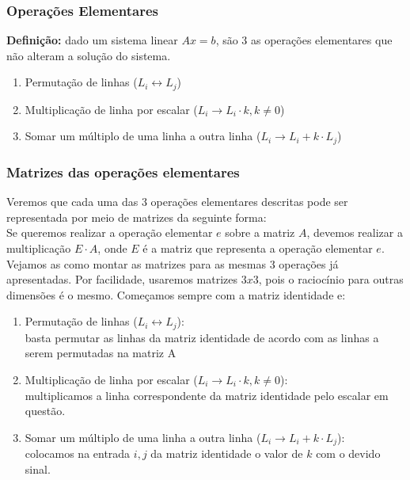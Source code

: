 \documentclass[12pt]{article}
\begin{document}
	\subsubsection{Operações Elementares}
	
	\textbf{Definição:}
	dado um sistema linear $Ax=b$, são 3 as operações elementares que não alteram a solução do sistema.
	\begin{enumerate}
		\item Permutação de linhas ($L_i\leftrightarrow L_j$)
		\item Multiplicação de linha por escalar ($L_i\rightarrow L_i \cdot k,k \neq 0$)
		\item Somar um múltiplo de uma linha a outra linha ($L_i \rightarrow L_i+k\cdot L_j$)
	\end{enumerate}
	
	\subsubsection{Matrizes das operações elementares}
	
	Veremos que cada uma das 3 operações elementares descritas pode ser representada por meio de matrizes da seguinte forma:\\
	
	Se queremos realizar a operação elementar $e$ sobre a matriz $A$, devemos realizar a multiplicação $E\cdot A$, onde $E$ é a matriz que representa a operação elementar $e$. \\
	
	Vejamos as como montar as matrizes para as mesmas 3 operações já apresentadas. Por facilidade, usaremos matrizes $3x3$, pois o raciocínio para outras dimensões é o mesmo. Começamos sempre com a matriz identidade e:
	\begin{enumerate}
		\item Permutação de linhas ($L_i\leftrightarrow L_j$):\\ basta permutar as linhas da matriz identidade de acordo com as linhas a serem permutadas na matriz A
		\item Multiplicação de linha por escalar ($L_i\rightarrow L_i \cdot k,k \neq 0$):\\ multiplicamos a linha correspondente da matriz identidade pelo escalar em questão.
		\item Somar um múltiplo de uma linha a outra linha ($L_i \rightarrow L_i+k\cdot L_j$):\\ colocamos na entrada $i,j$ da matriz identidade o valor de $k$ com o devido sinal.
	\end{enumerate}
	
\end{document}
